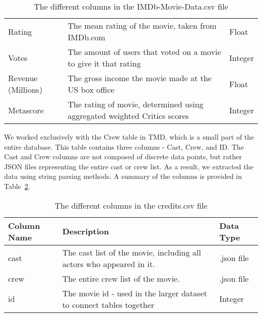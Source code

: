 \begin{table}[h]
\begin{tabular}{lp{10cm}l}
                Rating             & The mean rating of the movie, taken from IMDb.com                          & Float     \\
                Votes              & The amount of users that voted on a movie to give it that rating           & Integer   \\
                Revenue (Millions) & The gross income the movie made at the US box office                       & Float     \\
                Metascore          & The rating of movie, determined using aggregated weighted Critics scores   & Integer   \\
                \bottomrule
            \end{tabular}
            \caption[short]{The different columns in the IMDb-Movie-Data.csv file}\label{tab-IMDb-Movie-Data-Column-Description}
        \end{table}

        We worked exclusively with the Crew table in TMD, which is a small part of
            the entire database. 
        This table contains three columns - Cast, Crew, and ID.
        The Cast and Crew columns are not composed of discrete data points, 
            but rather JSON files representing the entire cast or crew list. 
        As a result, we extracted the data using string parsing methods. 
        A summary of the columns is provided in Table~\ref{tab-Credits-Column-Description}.
        \begin{table}[h]
            \centering
            \begin{tabular}{lp{10cm}l}
                \toprule
                Column Name & Description                                                              & Data Type  \\
                \midrule
                cast        & The cast list of the movie, including all actors who appeared in it.     & .json file \\
                crew        & The entire crew list of the movie. & .json file \\
                id          & The movie id - used in the larger dataset to connect tables together     & Integer    \\
                \bottomrule
            \end{tabular}
            \caption[short]{The different columns in the credits.csv file}\label{tab-Credits-Column-Description}
        \end{table}

